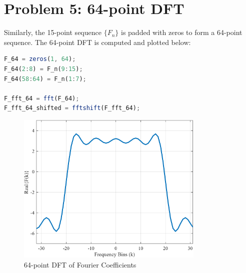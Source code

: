 \documentclass[12pt]{article}
\begin{document}
\newpage
\section*{Problem 5: 64-point DFT}
Similarly, the 15-point sequence $\{F_n\}$ is padded with zeros to form a 64-point sequence. The 64-point DFT is computed and plotted below:

\vspace{0.25cm}
\begin{lstlisting}[language=Octave, caption=MATLAB Script to Compute 64-point DFT]
F_64 = zeros(1, 64); 
F_64(2:8) = F_n(9:15); 
F_64(58:64) = F_n(1:7); 

F_fft_64 = fft(F_64);
F_fft_64_shifted = fftshift(F_fft_64); 
\end{lstlisting}

\vspace{1cm}
\begin{figure}[H]
    \centering
    \includegraphics[width=0.8\textwidth]{DFT_64.png}
    \caption{64-point DFT of Fourier Coefficients}
\end{figure}


\newpage
\end{document}
